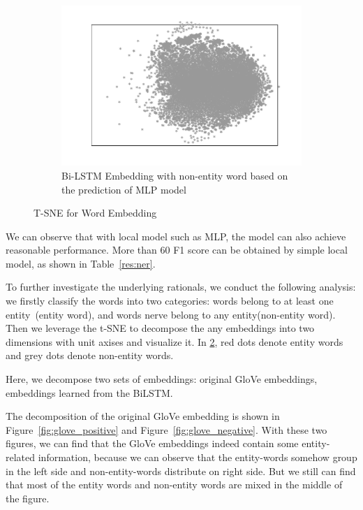 \documentclass{article}
\begin{document}
\begin{figure}[t]
\begin{subfigure}[t]{0.24\textwidth}
		\includegraphics[width=\linewidth]{bi_lstm_mlp_negative.pdf}
		\caption{Bi-LSTM Embedding with non-entity word based on the prediction of MLP model}
		\label{fig:bi_lstm_mlp_negative}
	\end{subfigure}
	\caption{T-SNE for Word Embedding}
	\label{fig:embedding}
\end{figure}

We can observe that with local model such as MLP, the model can also achieve reasonable performance. More than 60 F1 score can be obtained by simple local model, as shown in Table~\ref{res:ner}. %

To further investigate the underlying rationals, we conduct the following analysis: we firstly classify the words into two categories: words belong to at least one entity~(entity word), and words nerve belong to any entity(non-entity word). Then we leverage the t-SNE to decompose the any embeddings into two dimensions with unit axises and visualize it. In \ref{fig:embedding}, red dots denote entity words and grey dots denote non-entity words. 

Here, we decompose two sets of embeddings: original GloVe embeddings, embeddings learned from the BiLSTM.

The decomposition of the original GloVe embedding is shown in Figure~\ref{fig:glove_positive} and Figure~\ref{fig:glove_negative}. With these two figures, we can find that the GloVe embeddings indeed contain some entity-related information, because we can observe that the entity-words somehow group in the left side and non-entity-words distribute on right side. But we still can find that most of the entity words and non-entity words are mixed in the middle of the figure. 
\end{document}
